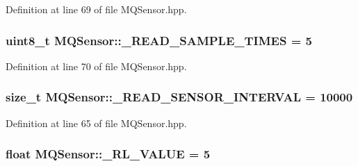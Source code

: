 Definition at line 69 of file M\+Q\+Sensor.\+hpp.

\subsubsection[{\texorpdfstring{\+\_\+\+R\+E\+A\+D\+\_\+\+S\+A\+M\+P\+L\+E\+\_\+\+T\+I\+M\+ES}{_READ_SAMPLE_TIMES}}]{\setlength{\rightskip}{0pt plus 5cm}uint8\+\_\+t M\+Q\+Sensor\+::\+\_\+\+R\+E\+A\+D\+\_\+\+S\+A\+M\+P\+L\+E\+\_\+\+T\+I\+M\+ES = 5\hspace{0.3cm}{\ttfamily [protected]}}\hypertarget{class_m_q_sensor_a3c6ba8a07087b67ee99941bced73e940}{}\label{class_m_q_sensor_a3c6ba8a07087b67ee99941bced73e940}


Definition at line 70 of file M\+Q\+Sensor.\+hpp.

\subsubsection[{\texorpdfstring{\+\_\+\+R\+E\+A\+D\+\_\+\+S\+E\+N\+S\+O\+R\+\_\+\+I\+N\+T\+E\+R\+V\+AL}{_READ_SENSOR_INTERVAL}}]{\setlength{\rightskip}{0pt plus 5cm}size\+\_\+t M\+Q\+Sensor\+::\+\_\+\+R\+E\+A\+D\+\_\+\+S\+E\+N\+S\+O\+R\+\_\+\+I\+N\+T\+E\+R\+V\+AL = 10000\hspace{0.3cm}{\ttfamily [protected]}}\hypertarget{class_m_q_sensor_a4a8e710f1bc61afb702d26ceb1366f11}{}\label{class_m_q_sensor_a4a8e710f1bc61afb702d26ceb1366f11}


Definition at line 65 of file M\+Q\+Sensor.\+hpp.

\subsubsection[{\texorpdfstring{\+\_\+\+R\+L\+\_\+\+V\+A\+L\+UE}{_RL_VALUE}}]{\setlength{\rightskip}{0pt plus 5cm}float M\+Q\+Sensor\+::\+\_\+\+R\+L\+\_\+\+V\+A\+L\+UE = 5\hspace{0.3cm}{\ttfamily [protected]}}\hypertarget{class_m_q_sensor_a2cf9585b95f5beaac2dc8edbab7eff42}{}\label{class_m_q_sensor_a2cf9585b95f5beaac2dc8edbab7eff42}


